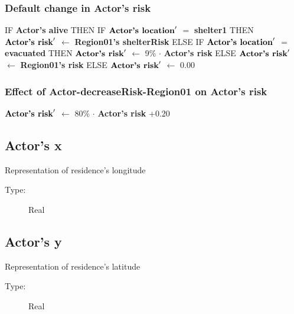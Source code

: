 \documentclass{article}%
\begin{document}
\subsubsection{Default change in Actor's risk}%
\label{ssubsec:Default change in Actor's risk}%
\begin{flushleft}%
IF %
\textbf{Actor's alive}%
\linebreak%
\hspace*{2em}%
THEN %
IF %
$\mbox{\textbf{Actor's location}} '$%
$=$%
\textbf{shelter1}%
\linebreak%
\hspace*{4em}%
THEN %
$\mbox{\textbf{Actor's risk}} '$%
$\leftarrow$%
\textbf{Region01's shelterRisk}%
\linebreak%
\hspace*{4em}%
ELSE %
IF %
$\mbox{\textbf{Actor's location}} '$%
$=$%
\textbf{evacuated}%
\linebreak%
\hspace*{6em}%
THEN %
$\mbox{\textbf{Actor's risk}} '$%
$\leftarrow$%
9\%%
$\cdot$%
\textbf{Actor's risk}%
\linebreak%
\hspace*{6em}%
ELSE %
$\mbox{\textbf{Actor's risk}} '$%
$\leftarrow$%
\textbf{Region01's risk}%
\linebreak%
\hspace*{2em}%
ELSE %
$\mbox{\textbf{Actor's risk}} '$%
$\leftarrow$%
0.00%
\end{flushleft}

%
\subsubsection{Effect of Actor{-}decreaseRisk{-}Region01 on Actor's risk}%
\label{ssubsec:Effect of Actor{-}decreaseRisk{-}Region01 on Actor's risk}%
\begin{flushleft}%
$\mbox{\textbf{Actor's risk}} '$%
$\leftarrow$%
80\%%
$\cdot$%
\textbf{Actor's risk}%
+0.20%
\end{flushleft}

%
\subsection{Actor's x}%
\label{subsec:Actor's x}%
Representation of residence's longitude%
\begin{description}%
\item[Type:]%
Real%
\end{description}

%
\subsection{Actor's y}%
\label{subsec:Actor's y}%
Representation of residence's latitude%
\begin{description}%
\item[Type:]%
Real%
\end{description}
\end{document}

